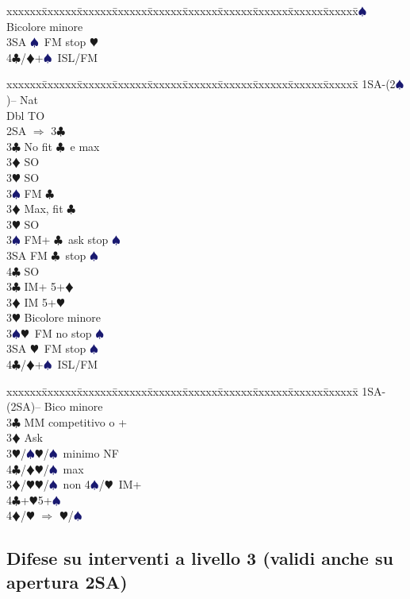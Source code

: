 \documentclass[a4paper,italian]{article}
\newcommand{\BC}{\textcolor{OliveGreen}{$\clubsuit$}}
\newcommand{\BD}{\textcolor{RedOrange}{$\vardiamondsuit$}}
\newcommand{\BH}{\textcolor{Red2}{$\varheartsuit${}}}
\newcommand{\BS}{\textcolor{MidnightBlue}{$\spadesuit${}}}
\newenvironment{bidtable}
{\begin{tabbing}

    xxxxxx\=xxxxxx\=xxxxxx\=xxxxxx\=xxxxxx\=xxxxxx\=xxxxxx\=xxxxxx\=xxxxxx\=xxxxxx\=\kill}
{\end{tabbing} }%
\begin{document}
\begin{multicols}{2}
\begin{bidtable}
        3\BS \> Bicolore minore\\
        3SA \BS\ FM stop \BH \\
        4\BC/\BD {}+\BS\ ISL/FM\-
    \end{bidtable}
    \begin{bidtable}
        1SA-(2\BS)-- \> \> Nat\+\\
        Dbl \> TO\\
        2SA \> $\Rightarrow$ 3\BC \+\\
        3\BC \> No fit \BC\ e max\+\\
        3\BD \> SO\\
        3\BH \> SO\\
        3\BS \> FM \BC \-\\
        3\BD \> Max, fit \BC \+\\
        3\BH \> SO\\
        3\BS \> FM+ \BC\ ask stop \BS \\
        3SA \> FM \BC\ stop \BS \\
        4\BC \> SO\-\-\\
        3\BC \> IM+ 5+\BD \\
        3\BD \> IM 5+\BH \\
        3\BH \> Bicolore minore\\
        3\BS {}\BH\ FM no stop \BS \\
        3SA \BH\ FM stop \BS \\
        4\BC/\BD {}+\BS\ ISL/FM\-
    \end{bidtable}
    \begin{bidtable}
        1SA-(2SA)-- \>\> Bico minore\+\\
        3\BC {} MM competitivo o +\+\\
        3\BD \> Ask\+\\
        3\BH/\BS {}\BH /\BS\ minimo NF\\
        4\BC/\BD {}\BH /\BS\ max\-\-\\
        3\BD/\BH {}\BH /\BS\ non 4\BS/\BH\ IM+\\
        4\BC {}+\BH 5+\BS \\
        4\BD/\BH \> $\Rightarrow$ \BH /\BS \-
    \end{bidtable}
    \vfill\null
    \columnbreak

    \subsection{Difese su interventi a livello 3 (validi anche su apertura 2SA)}


\end{multicols}
\end{document}
